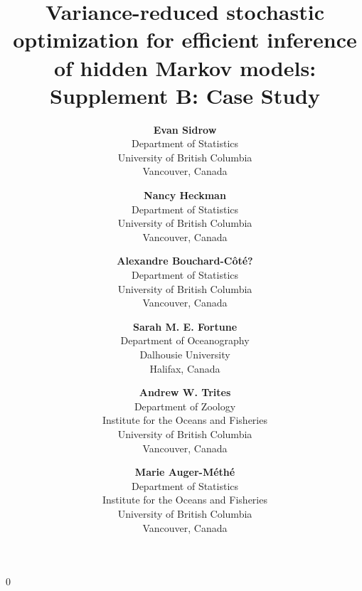 \documentclass[12pt]{article}
\newcommand{\blind}{0}
\begin{document}
%

\def\spacingset#1{\renewcommand{\baselinestretch}%
{#1}\small\normalsize} \spacingset{1}


\blind
{
    \title{Variance-reduced stochastic optimization for efficient inference of hidden Markov models: Supplement B: Case Study}

    \author{
      \textbf{Evan Sidrow} \\
      Department of Statistics \\
      University of British Columbia\\
      Vancouver, Canada \\
      \and
      \textbf{Nancy Heckman} \\
      Department of Statistics \\
      University of British Columbia \\
      Vancouver, Canada \\
      \and
      \textbf{Alexandre Bouchard-C\^ot\'e?} \\
      Department of Statistics \\
      University of British Columbia \\
      Vancouver, Canada \\
      \and
      \textbf{Sarah M. E. Fortune} \\
      Department of Oceanography \\
      Dalhousie University \\
      Halifax, Canada \\
      \and
      \textbf{Andrew W. Trites} \\
      Department of Zoology \\
      Institute for the Oceans and Fisheries \\
      University of British Columbia \\
      Vancouver, Canada \\
      \and
      \textbf{Marie Auger-M\'eth\'e} \\
      Department of Statistics \\
      Institute for the Oceans and Fisheries \\
      University of British Columbia \\
      Vancouver, Canada \\
    }
    \maketitle
} \fi
\end{document}
